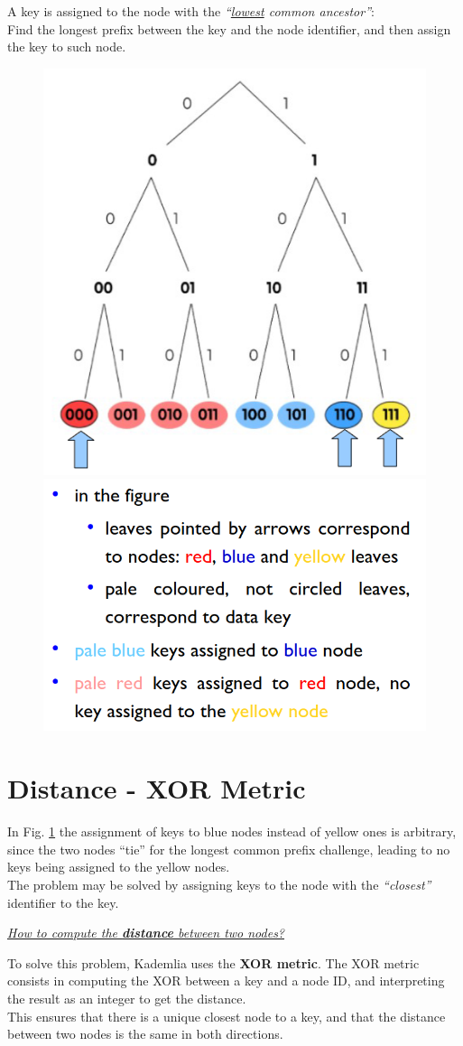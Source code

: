 \begin{paracol}{2}
   \colfill
   \begin{definition}
      A key is assigned to the node with the
      \textit{``\ul{lowest} common ancestor''}:\\
      Find the longest prefix between the
      key and the node identifier, and then assign the key to such node.
   \end{definition}
   \colfill
   \switchcolumn
   \begin{figure}[htbp]
      \centering
      \includegraphics[width=0.45\columnwidth]{images/kademlia_leaves01.png}
      \includegraphics[width=0.45\columnwidth]{images/kademlia_leaves02.png}
      \label{fig:kademlia_leaves}
   \end{figure}
\end{paracol}

\section{Distance - XOR Metric}
In Fig. \ref{fig:kademlia_leaves} the assignment of keys to blue nodes instead of yellow ones is arbitrary, since the two nodes ``tie'' for the longest common prefix challenge, leading to no keys being assigned to the yellow nodes.\\
The problem may be solved by assigning keys to the node with the \textit{``closest''} identifier to the key.\\
\begin{center}
   \textit{\ul{How to compute the \textbf{distance} between two nodes?}}
\end{center}
To solve this problem, Kademlia uses the \textbf{XOR metric}.
The XOR metric consists in computing the XOR between a key and a node ID, and interpreting the result as an integer to get the distance.\\
This ensures that there is a unique closest node to a key, and that the distance between two nodes is the same in both directions.

